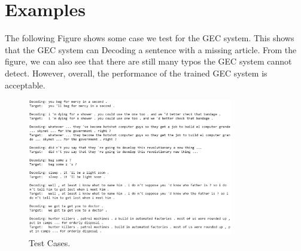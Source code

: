 \section{Examples}
The following Figure shows some case we test for the GEC system. This shows that the GEC system can Decoding a sentence with a missing article. From the figure, we can also see that there are still many typos the GEC system cannot detect. However, overall, the performance of the trained GEC system is acceptable.
\begin{figure}[ht]
    \centering
    \includegraphics[width=0.8\textwidth]{testcase.png}
    \caption{Test Cases.}
    \label{fig:10}
\end{figure}